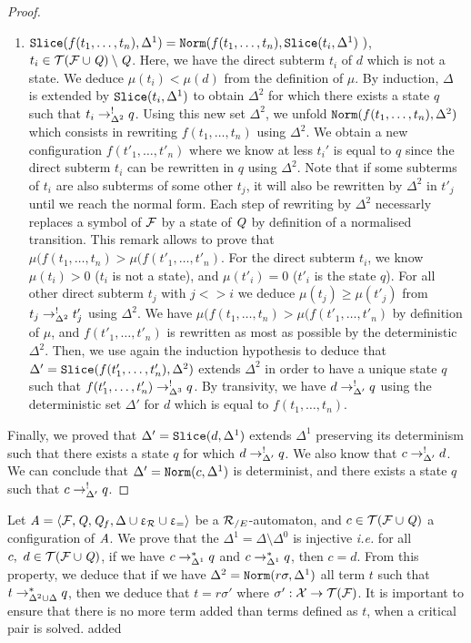 \begin{proof}
\begin{enumerate}
   \item $\mathtt{Slice}(f(t_1, \dots, t_n), \Delta^1) = \mathtt{Norm}(f(t_1,\dots, t_n), \mathtt{Slice}(t_i, \Delta^1)\ )$, $t_i \in \mathcal{ T(F \cup \mathit Q)} \setminus \mathit Q$.
     Here, we have the direct subterm $t_i$ of $d$ which is not a state. We deduce $\mu(t_i) < \mu(d)$ from the definition of $\mu$.
     By induction, $\Delta$ is extended by $\mathtt{Slice}(t_i, \Delta^1)$ to obtain $\Delta^2$ for which there exists a state $q$ 
     such that $t_i \rightarrow^!_{\Delta^2} q$.  Using this new set $\Delta^2$, we unfold $\mathtt{Norm}(f(t_1,\dots, t_n), \Delta^2)$ which consists in rewriting 
     $f(t_1, \dots, t_n)$ using $\Delta^2$. We obtain a new configuration $f(t'_1, \dots, t'_n)$ where we know at less 
     $t_i'$ is equal to $q$ since the direct subterm $t_i$ can be rewritten in $q$ using $\Delta^2$. Note that if some subterms of $t_i$
     are also subterms of some other $t_j$, it will also be rewritten by $\Delta^2$ in $t'_j$ until we reach the normal form.
     Each step of rewriting by $\Delta^2$ necessarly replaces a symbol of $\mathcal{F}$ by a state of $\mathit Q$ by definition of a normalised transition.
     This remark allows to prove that $\mu(f(t_1,\dots,t_n) > \mu(f(t'_1,\dots,t'_n)$.
     For the direct subterm $t_i$, we know $\mu(t_i) > 0$ ($t_i$ is not a state), and $\mu(t'_i) = 0$ ($t'_i$ is the state $q$).
     For all other direct subterm $t_j$ with $j <> i$ we deduce $\mu(t_j) \ge \mu(t'_j)$ from $t_j \rightarrow^!_{\Delta^2} t'_j$ using $\Delta^2$.
     We have $\mu(f(t_1,\dots,t_n) > \mu(f(t'_1,\dots,t'_n)$ by definition of $\mu$, and $f(t'_1,\dots,t'_n)$ is rewritten as most
     as possible by the deterministic $\Delta^2$. Then, we use again the induction hypothesis to deduce that $\Delta' = \mathtt{Slice}(f(t'_1,\dots,t'_n), \Delta^2)$
     extends $\Delta^2$ in order to have a unique state $q$ such that $f(t'_1,\dots,t'_n) \rightarrow^!_{\Delta^3} q$.
     By transivity, we have $d \rightarrow^!_{\Delta'} q$ using the deterministic set $\Delta'$ for $d$ which is equal to $f(t_1, \dots, t_n)$.

   \end{enumerate}
   Finally, we proved that $\Delta' = \mathtt{Slice}(d, \Delta^1)$ extends $\Delta^1$ preserving its determinism such that there exists a state
   $q$ for which $d \rightarrow^!_{\Delta'} q$. We also know that $c \rightarrow^!_{\Delta'} d$. We can conclude that $\Delta' = \mathtt{Norm}(c, \Delta^1)$
   is determinist, and there exists a state $q$ such that $c \rightarrow^!_{\Delta'} q$.
 \end{proof}

 Let $\mathit A = \langle \mathcal{F}, \mathit Q, \mathit Q_f, \Delta \cup \upvarepsilon_{\mathcal R} \cup \upvarepsilon_{=} \rangle$ be a ${\mathcal R_{/E}}$-automaton, and $c \in \mathcal{ T(F \cup \mathit Q)}$ a
 configuration of $\mathit A$.
 We prove that the $\Delta^1 = \Delta \setminus \Delta^0$ is injective {\em i.e.} for all $c,\ d \in \mathcal{ T(F \cup \mathit Q)}$,
 if we have $c \rightarrow^*_{\Delta^1} q$ and $c \rightarrow^*_{\Delta^1} q$, then $c = d$. From this property, we deduce
 that if we have $\Delta^2 = \mathtt{Norm}(r\sigma, \Delta^1)$ all term $t$ such that $t \rightarrow^*_{\Delta^2 \cup \Delta} q$,
 then we deduce that $t = r\sigma'$ where $\sigma' : \mathcal X \rightarrow \mathcal{T(F)}$. It is important to ensure that there is no more
 term added than terms defined as $t$, when a critical pair is solved.
 added 
 
